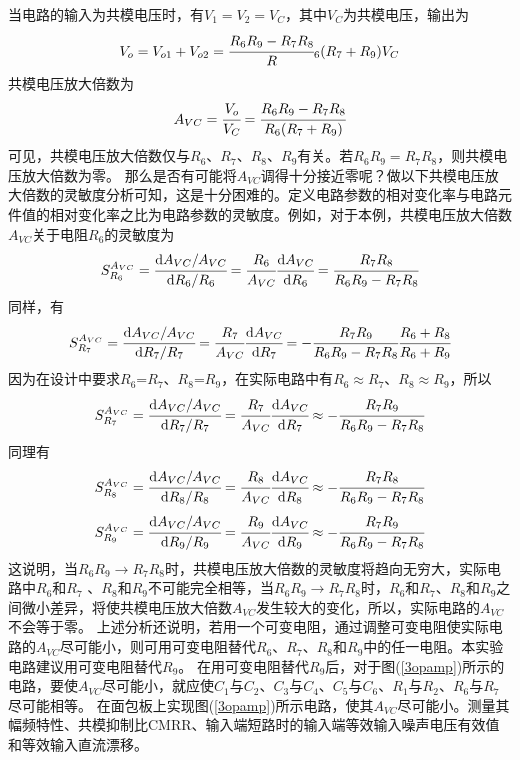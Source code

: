 \documentclass[a4paper]{article}
\begin{document}
当电路的输入为共模电压时，有$V_1=V_2=V_C$，其中$V_C$为共模电压，输出为
\begin{equation}
V_o = V_{o1}+V_{o2} = \cfrac{R_6R_9 - R_7R_8}R_6(R_7+R_9){}V_C\label{5.25}
\end{equation}
共模电压放大倍数为
\begin{equation}
A_{VC} = \cfrac{V_o}{V_C} = \cfrac{R_6R_9-R_7R_8}{R_6(R_7+R_9)}\label{5.26}
\end{equation}
可见，共模电压放大倍数仅与$R_6$、$R_7$、$R_8$、$R_9$有关。若$R_6R_9=R_7R_8$，则共模电压放大倍数为零。
那么是否有可能将$A_{VC}$调得十分接近零呢？做以下共模电压放大倍数的灵敏度分析可知，这是十分困难的。定义电路参数的相对变化率与电路元件值的相对变化率之比为电路参数的灵敏度。例如，对于本例，共模电压放大倍数$A_{VC}$关于电阻$R_6$的灵敏度为
\begin{equation}
S_{R_6}^{A_{VC}} = \cfrac{\text{d}A_{VC}/A_{VC}}{\text{d}R_6/R_6} = \cfrac{R_6}{A_{VC}}\cfrac{\text{d}A_{VC}}{\text{d}R_6} = \cfrac{R_7R_8}{R_6R_9 - R_7R_8}\label{5.27}
\end{equation}
同样，有
\begin{equation}
S_{R_7}^{A_{VC}} = \cfrac{\text{d}A_{VC}/A_{VC}}{\text{d}R_7/R_7} = \cfrac{R_7}{A_{VC}}\cfrac{\text{d}A_{VC}}{\text{d}R_7} = -\cfrac{R_7R_9}{R_6R_9 - R_7R_8}\cfrac{R_6+R_8}{R_6+R_9}\label{5.28}
\end{equation}
因为在设计中要求$R_6$=$R_7$、$R_8$=$R_9$，在实际电路中有$R_6\approx R_7$、$R_8\approx R_9$，所以
\begin{equation}
S_{R_7}^{A_{VC}} = \cfrac{\text{d}A_{VC}/A_{VC}}{\text{d}R_7/R_7} = \cfrac{R_7}{A_{VC}}\cfrac{\text{d}A_{VC}}{\text{d}R_7} \approx -\cfrac{R_7R_9}{R_6R_9 - R_7R_8}\label{5.29}
\end{equation}
同理有
\begin{equation}
S_{R_8}^{A_{VC}} = \cfrac{\text{d}A_{VC}/A_{VC}}{\text{d}R_8/R_8} = \cfrac{R_8}{A_{VC}}\cfrac{\text{d}A_{VC}}{\text{d}R_8} \approx -\cfrac{R_7R_8}{R_6R_9 - R_7R_8}\label{5.30}
\end{equation}
\begin{equation}
S_{R_9}^{A_{VC}} = \cfrac{\text{d}A_{VC}/A_{VC}}{\text{d}R_9/R_9} = \cfrac{R_9}{A_{VC}}\cfrac{\text{d}A_{VC}}{\text{d}R_9} \approx -\cfrac{R_7R_9}{R_6R_9 - R_7R_8}\label{5.31}
\end{equation}
这说明，当$R_6R_9\to R_7R_8$时，共模电压放大倍数的灵敏度将趋向无穷大，实际电路中$R_6$和$R_7$ 、$R_8$和$R_9$不可能完全相等，当$R_6R_9\to R_7R_8$时，$R_6$和$R_7$、$R_8$和$R_9$之间微小差异，将使共模电压放大倍数$A_{VC}$发生较大的变化，所以，实际电路的$A_{VC}$不会等于零。
上述分析还说明，若用一个可变电阻，通过调整可变电阻使实际电路的$A_{VC}$尽可能小，则可用可变电阻替代$R_6$、$R_7$、$R_8$和$R_9$中的任一电阻。本实验电路建议用可变电阻替代$R_9$。
在用可变电阻替代$R_9$后，对于图(\ref{3opamp})所示的电路，要使$A_{VC}$尽可能小，就应使$C_1$与$C_2$、$C_3$与$C_4$、$C_5$与$C_6$、$R_1$与$R_2$、$R_6$与$R_7$尽可能相等。
在面包板上实现图(\ref{3opamp})所示电路，使其$A_{VC}$尽可能小。测量其幅频特性、共模抑制比CMRR、输入端短路时的输入端等效输入噪声电压有效值和等效输入直流漂移。
\end{document}
